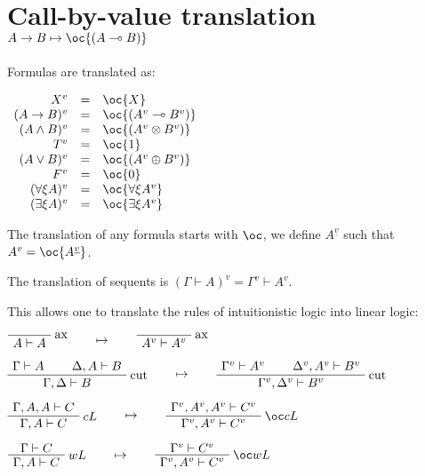 \section{\texorpdfstring{Call-by-value translation \(A\imp B \mapsto \oc{(A\limp B)}\)}{Call-by-value translation A\textbackslash{}imp B \textbackslash{}mapsto \textbackslash{}oc\{(A\textbackslash{}limp B)\}}}\label{call-by-value-translation-aimp-b-mapsto-ocalimp-b}

Formulas are translated as:

\(\begin{array}{rcl}
X^v &  = &  \oc{X} \\
(A\imp B)^v &  = &  \oc{(A^v\limp B^v)} \\
(A\wedge B)^v &  = &  \oc{(A^v \tens B^v)} \\
T^v &  = &  \oc{\one} \\
(A\vee B)^v &  = &  \oc{(A^v\plus B^v)} \\
F^v &  = &  \oc{\zero} \\
(\forall\xi A)^v &  = &  \oc{\forall\xi A^v} \\
(\exists\xi A)^v &  = &  \oc{\exists\xi A^v}
\end{array}\)

The translation of any formula starts with \(\oc\), we define
\(A^{\underline{v}}\) such that \(A^v=\oc{A^{\underline{v}}}\).

The translation of sequents is
\((\Gamma\vdash A)^v = \Gamma^v\vdash A^v\).

This allows one to translate the rules of intuitionistic logic into
linear logic:

\(\LabelRule{\rulename{ax}}
\NulRule{A\vdash A}
\DisplayProof
\qquad\mapsto\qquad
\LabelRule{\rulename{ax}}
\NulRule{A^v\vdash A^v}
\DisplayProof\)

\(\AxRule{\Gamma\vdash A}
\AxRule{\Delta,A\vdash B}
\LabelRule{\rulename{cut}}
\BinRule{\Gamma,\Delta\vdash B}
\DisplayProof
\qquad\mapsto\qquad
\AxRule{\Gamma^v\vdash A^v}
\AxRule{\Delta^v,A^v\vdash B^v}
\LabelRule{\rulename{cut}}
\BinRule{\Gamma^v,\Delta^v\vdash B^v}
\DisplayProof\)

\(\AxRule{\Gamma,A,A\vdash C}
\LabelRule{c L}
\UnaRule{\Gamma,A\vdash C}
\DisplayProof
\qquad\mapsto\qquad
\AxRule{\Gamma^v,A^v,A^v\vdash C^v}
\LabelRule{\oc c L}
\UnaRule{\Gamma^v,A^v\vdash C^v}
\DisplayProof\)

\(\AxRule{\Gamma\vdash C}
\LabelRule{w L}
\UnaRule{\Gamma,A\vdash C}
\DisplayProof
\qquad\mapsto\qquad
\AxRule{\Gamma^v\vdash C^v}
\LabelRule{\oc w L}
\UnaRule{\Gamma^v,A^v\vdash C^v}
\DisplayProof\)

